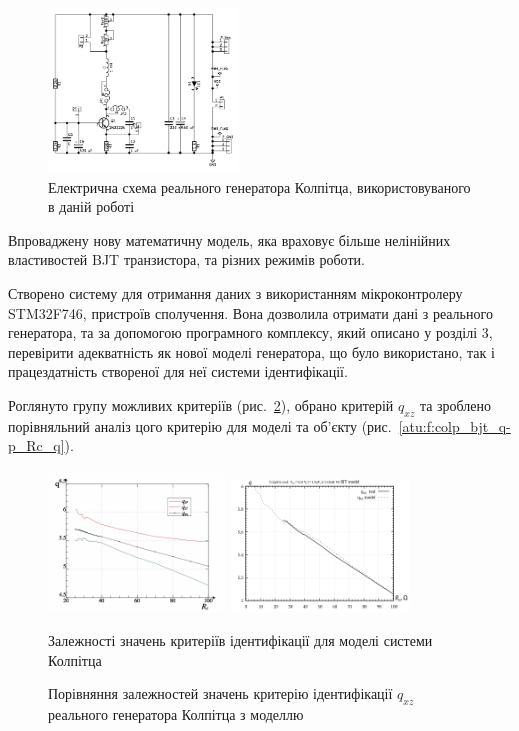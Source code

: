 \documentclass[a4paper,13pt]{atuaref}
\begin{document}
\begin{figure}[htb!]
\centerline{\includegraphics[width=0.45\textwidth]{p6/p/colp_schem_real.png} }
\caption{Електрична схема реального генератора Колпітца, використовуваного в даній роботі}
\label{atu:f:colp_schem_real}
\end{figure}

Впроваджену нову математичну модель,
яка враховує більше нелінійних властивостей
BJT транзистора, та різних режимів роботи.


Створено систему для отримання даних з використанням мікроконтролеру STM32F746, пристроїв сполучення.
Вона дозволила отримати дані з реального
генератора, та за допомогою програмного комплексу,
який описано у розділі 3, перевірити адекватність як
нової моделі генератора, що було використано,
так і працездатність створеної для неї системи ідентифікації.

Роглянуто групу можливих критеріїв (рис.~\ref{atu:f:colp_q_cml}),
обрано критерій $q_{xz}$
та зроблено порівняльний аналіз цого критерію
для моделі та об'єкту (рис.~\ref{atu:f:colp_bjt_q-p_Rc_q}).

\begin{figure}[htb!]
  \includegraphics[width=0.42\textwidth]{p6/p/colp_read_q-p_Rc_q.png}
  \hfill
  \includegraphics[width=0.42\textwidth]{p6/p/colp_q_cml.png}
\\
\parbox[t]{0.45\textwidth}{
  \caption{Залежності значень критеріїв ідентифікації для моделі системи Колпітца}
  \label{atu:f:colp_bjt_q-p_Rc_q}
}
\hfill
\parbox[t]{0.45\textwidth}{
  \caption{Порівняння залежностей значень критерію ідентифікації $q_{xz}$ реального генератора Колпітца з моделлю}
  \label{atu:f:colp_q_cml}
}
\end{figure}
\end{document}
